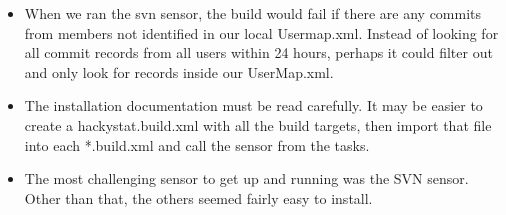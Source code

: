 \documentclass[11pt]{article}
\begin{document}
\begin{itemize}
\item When we ran the svn sensor, the build would fail if there are any commits from members not identified in our local Usermap.xml.  Instead of looking for all commit records from all users within 24 hours, perhaps it could filter out and only look for records inside our UserMap.xml.

\item The installation documentation must be read carefully.  It may be easier to create a hackystat.build.xml with all the build targets, then import that file into each *.build.xml and call the sensor from the tasks.

\item The most challenging sensor to get up and running was the SVN sensor.  Other than that, the others seemed fairly easy to install.

\end{itemize}
\end{document}
